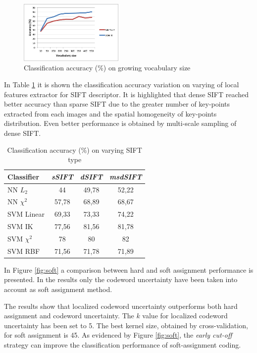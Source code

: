 \begin{figure}[h]
\begin{center}
\includegraphics[width=0.45\textwidth]{images/vocabulary.png}
\end{center}
  \caption{Classification accuracy (\%) on growing vocabulary size}
\label{fig:vocabulary}
\end{figure}

In Table \ref{tab:sifttype} it is shown the classification accuracy variation on varying of local features extractor for SIFT descriptor. It is highlighted that dense SIFT reached better accuracy than sparse SIFT due to the greater number of key-points extracted from each images and the spatial homogeneity of key-points distribution. Even better performance is obtained by multi-scale sampling of dense SIFT. 

\begin{table}[h]
\begin{center}
\begin{tabular}{|l|c|c|c|}
\hline
Classifier & \emph{sSIFT} & \emph{dSIFT} & \emph{msdSIFT}\\
\hline\hline
NN $L_2$ & 44 & 49,78 & 52,22\\
NN $\chi^2$ & 57,78 & 68,89 & 68,67\\
SVM Linear & 69,33 & 73,33 & 74,22\\
SVM IK & 77,56 & 81,56 & 81,78\\
SVM $\chi^2$ & 78 & 80 & 82\\
SVM RBF & 71,56 & 71,78 & 71,89 \\
\hline
\end{tabular}
\end{center}
\label{tab:sifttype}
\caption{Classification accuracy (\%) on varying SIFT type}
\end{table}

In Figure \ref{fig:soft} a comparison between hard and soft assignment performance is presented. In the results only the codeword uncertainty have been taken into account as soft assignment method.

The results show that localized codeword uncertainty outperforms both hard assignment and codeword uncertainty. The $k$ value for localized codeword uncertainty has been set to 5. The best kernel size, obtained by cross-validation, for soft assignment is 45. As evidenced by Figure \ref{fig:soft}, the \emph{early cut-off} strategy can improve the classification performance of soft-assignment coding.

